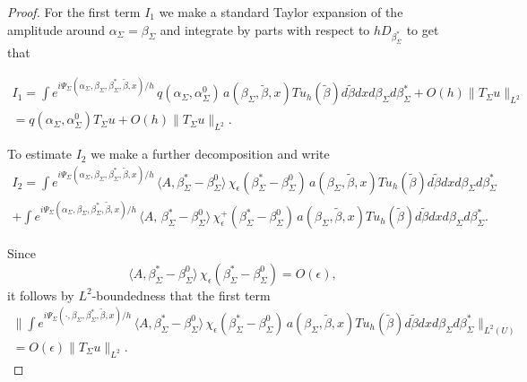 \documentclass[10pt,a4paper]{amsart}
\begin{document}
\begin{proof}
For the first term $I_1$ we make a standard Taylor expansion of the amplitude around $\alpha_{\Sigma} = \beta_{\Sigma}$ and integrate by parts with respect to $hD_{\beta_{\Sigma}^*}$ to get that

\begin{eqnarray} \label{I1}
I_1 =   \int e^{i \Psi_{\Sigma}(\alpha_{\Sigma}, \beta_{\Sigma}, \beta_{\Sigma}^*, \tilde{\beta},x)/h} \, q(\alpha_{\Sigma}, \alpha_{\Sigma}^{0}) \, a (\beta_{\Sigma}, \tilde{\beta},x) Tu_h(\tilde{\beta}) d\tilde{\beta}  dx d\beta_{\Sigma} d \beta_{\Sigma}^* + O(h) \| T_{\Sigma} u \|_{L^2} \nonumber \\
=  q(\alpha_{\Sigma}, \alpha_{\Sigma}^{0}) T_{\Sigma}u +  O(h) \| T_{\Sigma} u \|_{L^2}. \hspace{2in}
 \end{eqnarray}

 
 To estimate $I_2$ we make a further decomposition and write
\begin{eqnarray} \label{I2}
I_2 = \int e^{i \Psi_{\Sigma}(\alpha_{\Sigma}, \beta_{\Sigma}, \beta_{\Sigma}^*, \tilde{\beta},x)/h} \, \langle A, \beta^{*}_{\Sigma} - \beta_{\Sigma}^{0}  \rangle  \, \chi_{\epsilon} ( \beta^{*}_{\Sigma} - \beta_{\Sigma}^{0}  ) \, a (\beta_{\Sigma}, \tilde{\beta},x) Tu_h(\tilde{\beta}) d\tilde{\beta}  dx d\beta_{\Sigma} d \beta_{\Sigma}^* \nonumber \\
+ \int e^{i \Psi_{\Sigma}(\alpha_{\Sigma}, \beta_{\Sigma}, \beta_{\Sigma}^*, \tilde{\beta},x)/h} \, \langle A,   \,  \beta^{*}_{\Sigma} - \beta_{\Sigma}^{0}  \rangle  \, \chi_{\epsilon}^+ ( \beta^{*}_{\Sigma} - \beta_{\Sigma}^{0}  ) \, a (\beta_{\Sigma}, \tilde{\beta},x) Tu_h(\tilde{\beta}) d\tilde{\beta}  dx d\beta_{\Sigma} d \beta_{\Sigma}^* .
\end{eqnarray}

Since 
 $$\langle A, \beta^{*}_{\Sigma} - \beta_{\Sigma}^{0}  \rangle  \, \chi_{\epsilon} ( \beta^{*}_{\Sigma} - \beta_{\Sigma}^{0}  ) = O(\epsilon),$$
 it follows by $L^2$-boundedness that the first term
 \begin{eqnarray} \label{I2.1}
 \Big\|  \int e^{i \Psi_{\Sigma}(\cdot, \beta_{\Sigma}, \beta_{\Sigma}^*, \tilde{\beta},x)/h} \, \langle A, \beta^{*}_{\Sigma} - \beta_{\Sigma}^{0}  \rangle  \, \chi_{\epsilon} ( \beta^{*}_{\Sigma} - \beta_{\Sigma}^{0}  ) \, a (\beta_{\Sigma}, \tilde{\beta},x) Tu_h(\tilde{\beta}) d\tilde{\beta}  dx d\beta_{\Sigma} d \beta_{\Sigma}^* \Big\|_{L^2(U)} \nonumber \\
 = O(\epsilon) \|T_{\Sigma} u \|_{L^2}.\end{eqnarray}
 


\end{proof}
\end{document}

